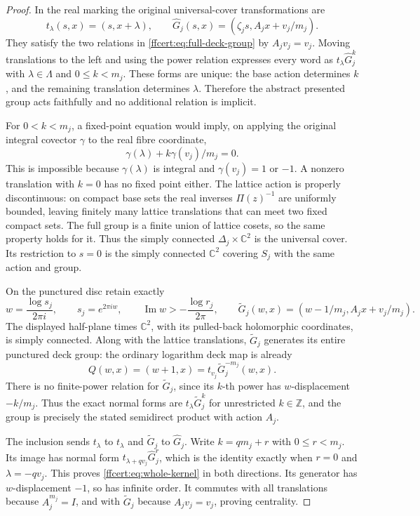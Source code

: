 \begin{proof}
In the real marking the original universal-cover transformations are
\[
 t_\lambda(s,x)=(s,x+\lambda),\qquad
 \widehat G_j(s,x)=(\zeta_js,A_jx+v_j/m_j).
 \tag{FF32}\label{ffcert:eq:cover-real-action}
\]
They satisfy the two relations in
\eqref{ffcert:eq:full-deck-group} by $A_jv_j=v_j$.
Moving translations to the left and using the power relation expresses
every word as $t_\lambda\widehat G_j^k$ with $\lambda\in\Lambda$
and $0\le k<m_j$. These forms are unique: the base action determines
$k$, and the remaining translation determines $\lambda$. Therefore
the abstract presented group acts faithfully and no additional relation
is implicit.

For $0<k<m_j$, a fixed-point equation would imply, on applying the
original integral covector $\gamma$ to the real fibre coordinate,
\[
 \gamma(\lambda)+k\gamma(v_j)/m_j=0.
 \tag{FF33}\label{ffcert:eq:cover-freeness}
\]
This is impossible because $\gamma(\lambda)$ is integral and
$\gamma(v_j)=1$ or $-1$. A nonzero translation with $k=0$ has no
fixed point either. The lattice action is properly discontinuous:
on compact base sets the real inverses $\Pi(z)^{-1}$ are uniformly
bounded, leaving finitely many lattice translations that can meet two
fixed compact sets. The full group is a finite union of lattice cosets,
so the same property holds for it. Thus the simply connected
$\Delta_j\times\mathbb C^2$ is the universal cover. Its restriction
to $s=0$ is the simply connected $\mathbb C^2$ covering $S_j$ with
the same action and group.

On the punctured disc retain exactly
\[
 w=\frac{\log s_j}{2\pi i},\qquad s_j=e^{2\pi iw},\qquad
 \operatorname{Im}w> -\frac{\log r_j}{2\pi},
 \qquad
 \widetilde G_j(w,x)=(w-1/m_j,A_jx+v_j/m_j).
 \tag{FF34}\label{ffcert:eq:log-cover-action}
\]
The displayed half-plane times $\mathbb C^2$, with its pulled-back
holomorphic coordinates, is simply connected. Along with the lattice
translations, $\widetilde G_j$ generates its entire punctured deck
group: the ordinary logarithm deck map is already
\[
 Q(w,x)=(w+1,x)=t_{v_j}\widetilde G_j^{-m_j}(w,x).
 \tag{FF35}\label{ffcert:eq:ordinary-log-deck}
\]
There is no finite-power relation for $\widetilde G_j$, since its
$k$-th power has $w$-displacement $-k/m_j$. Thus the exact normal
forms are $t_\lambda\widetilde G_j^k$ for unrestricted
$k\in\mathbb Z$, and the group is precisely the stated semidirect
product with action $A_j$.

The inclusion sends $t_\lambda$ to $t_\lambda$ and
$\widetilde G_j$ to $\widehat G_j$. Write $k=qm_j+r$ with
$0\le r<m_j$. Its image has normal form
$t_{\lambda+qv_j}\widehat G_j^r$, which is the identity exactly
when $r=0$ and $\lambda=-qv_j$. This proves
\eqref{ffcert:eq:whole-kernel} in both directions. Its generator has
$w$-displacement $-1$, so has infinite order. It commutes with all
translations because $A_j^{m_j}=I$, and with
$\widetilde G_j$ because $A_jv_j=v_j$, proving centrality.
\end{proof}

